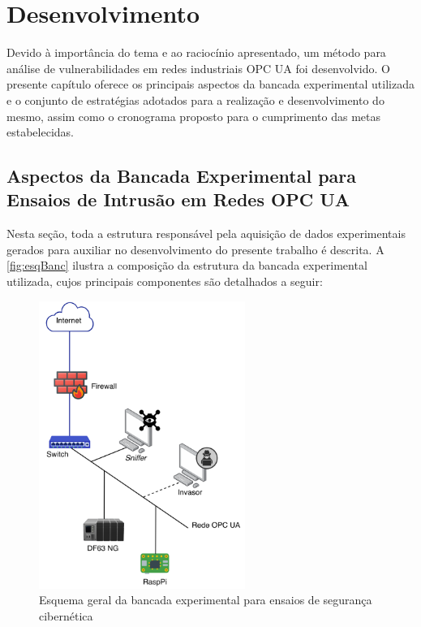 \chapter{Desenvolvimento} \label{cap:desenvolvimento}

Devido à importância do tema e ao raciocínio apresentado, um método para análise de vulnerabilidades em redes industriais OPC UA foi desenvolvido. O presente capítulo oferece os principais aspectos da bancada experimental utilizada e o conjunto de estratégias adotados para a realização e desenvolvimento do mesmo, assim como o cronograma proposto para o cumprimento das metas estabelecidas.

\section{Aspectos da Bancada Experimental para Ensaios de Intrusão em Redes OPC UA}

    Nesta seção, toda a estrutura responsável pela aquisição de dados experimentais gerados para auxiliar no desenvolvimento do presente trabalho é descrita. A \autoref{fig:esqBanc} ilustra a composição da estrutura da bancada experimental utilizada, cujos principais componentes são detalhados a seguir:

    \begin{figure}[htbp]
        \caption{\label{fig:esqBanc}Esquema geral da bancada experimental para ensaios de segurança cibernética}
        \begin{center}
            \includegraphics[width=0.6\textwidth]{USPSC-img/bancada.png}
        \end{center}
    \end{figure}

